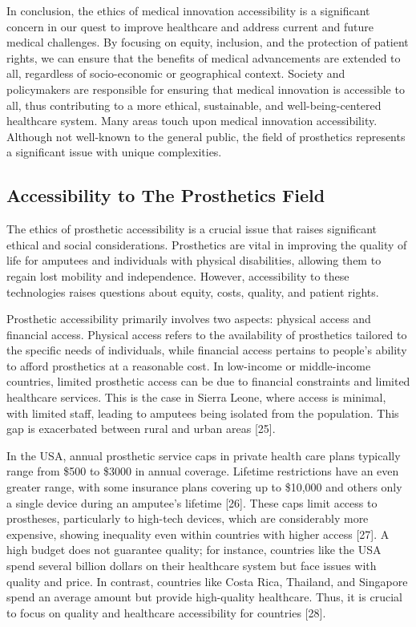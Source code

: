 In conclusion, the ethics of medical innovation accessibility is a significant concern in our quest to improve healthcare and address current and future medical challenges. By focusing on equity, inclusion, and the protection of patient rights, we can ensure that the benefits of medical advancements are extended to all, regardless of socio-economic or geographical context. Society and policymakers are responsible for ensuring that medical innovation is accessible to all, thus contributing to a more ethical, sustainable, and well-being-centered healthcare system. Many areas touch upon medical innovation accessibility. Although not well-known to the general public, the field of prosthetics represents a significant issue with unique complexities.

\subsection{Accessibility to The Prosthetics Field}
The ethics of prosthetic accessibility is a crucial issue that raises significant ethical and social considerations. Prosthetics are vital in improving the quality of life for amputees and individuals with physical disabilities, allowing them to regain lost mobility and independence. However, accessibility to these technologies raises questions about equity, costs, quality, and patient rights.

Prosthetic accessibility primarily involves two aspects: physical access and financial access. Physical access refers to the availability of prosthetics tailored to the specific needs of individuals, while financial access pertains to people's ability to afford prosthetics at a reasonable cost. In low-income or middle-income countries, limited prosthetic access can be due to financial constraints and limited healthcare services. This is the case in Sierra Leone, where access is minimal, with limited staff, leading to amputees being isolated from the population. This gap is exacerbated between rural and urban areas [25].

In the USA, annual prosthetic service caps in private health care plans typically range from \$500 to \$3000 in annual coverage. Lifetime restrictions have an even greater range, with some insurance plans covering up to \$10,000 and others only a single device during an amputee’s lifetime [26]. These caps limit access to prostheses, particularly to high-tech devices, which are considerably more expensive, showing inequality even within countries with higher access [27]. A high budget does not guarantee quality; for instance, countries like the USA spend several billion dollars on their healthcare system but face issues with quality and price. In contrast, countries like Costa Rica, Thailand, and Singapore spend an average amount but provide high-quality healthcare. Thus, it is crucial to focus on quality and healthcare accessibility for countries [28].

